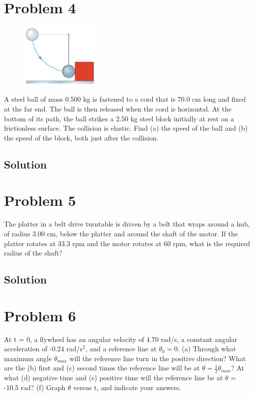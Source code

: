 \documentclass[12pt]{article}
\begin{document}
\pagebreak
\section*{Problem 4}
\begin{figure}
    \vspace{-30pt}
    \includegraphics[width=0.35\textwidth]{graph_4.png} 
\end{figure}
A steel ball of mass 0.500 kg is fastened to a cord that is 70.0 cm long and fixed at the far end. The
ball is then released when the cord is horizontal. At the bottom of its path, the ball strikes a 2.50 kg steel
block initially at rest on a frictionless surface. The collision is elastic. Find (a) the speed of the ball and
(b) the speed of the block, both just after the collision.

\subsection*{Solution}


\pagebreak
\section*{Problem 5}
The platter in a belt drive turntable is driven by a belt that wraps around a hub, of radius 3.00
cm, below the platter and around the shaft of the motor. If the platter rotates at 33.3 rpm and the
motor rotates at 60 rpm, what is the required radius of the shaft?

\subsection*{Solution}


\pagebreak
\section*{Problem 6}
At t = 0, a flywheel has an angular velocity of 4.70 rad/s, a constant angular acceleration of
-0.24 rad/s$^2$, and a reference line at $\theta_0 = 0$. (a) Through what maximum angle $\theta_{max}$ will the
reference line turn in the positive direction? What are the (b) first and (c) second times the reference line will be at $\theta = \frac{1}{2}\theta_{max}$? At what (d) negative time and (e) positive time will the
reference line be at $\theta$ = -10.5 rad? (f) Graph $\theta$ versus t, and indicate your answers.
\end{document}
